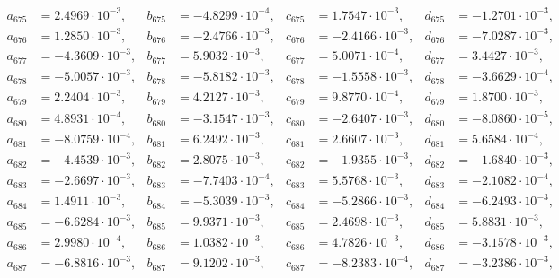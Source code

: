 \begin{align*}
  a_{ 675 } &= 2.4969 \cdot 10^{ -3 }, & b_{ 675 } &= -4.8299 \cdot 10^{ -4 }, & c_{ 675 } &= 1.7547 \cdot 10^{ -3 }, & d_{ 675 } &= -1.2701 \cdot 10^{ -3 }, \\ 
  a_{ 676 } &= 1.2850 \cdot 10^{ -3 }, & b_{ 676 } &= -2.4766 \cdot 10^{ -3 }, & c_{ 676 } &= -2.4166 \cdot 10^{ -3 }, & d_{ 676 } &= -7.0287 \cdot 10^{ -3 }, \\ 
  a_{ 677 } &= -4.3609 \cdot 10^{ -3 }, & b_{ 677 } &= 5.9032 \cdot 10^{ -3 }, & c_{ 677 } &= 5.0071 \cdot 10^{ -4 }, & d_{ 677 } &= 3.4427 \cdot 10^{ -3 }, \\ 
  a_{ 678 } &= -5.0057 \cdot 10^{ -3 }, & b_{ 678 } &= -5.8182 \cdot 10^{ -3 }, & c_{ 678 } &= -1.5558 \cdot 10^{ -3 }, & d_{ 678 } &= -3.6629 \cdot 10^{ -4 }, \\ 
  a_{ 679 } &= 2.2404 \cdot 10^{ -3 }, & b_{ 679 } &= 4.2127 \cdot 10^{ -3 }, & c_{ 679 } &= 9.8770 \cdot 10^{ -4 }, & d_{ 679 } &= 1.8700 \cdot 10^{ -3 }, \\ 
  a_{ 680 } &= 4.8931 \cdot 10^{ -4 }, & b_{ 680 } &= -3.1547 \cdot 10^{ -3 }, & c_{ 680 } &= -2.6407 \cdot 10^{ -3 }, & d_{ 680 } &= -8.0860 \cdot 10^{ -5 }, \\ 
  a_{ 681 } &= -8.0759 \cdot 10^{ -4 }, & b_{ 681 } &= 6.2492 \cdot 10^{ -3 }, & c_{ 681 } &= 2.6607 \cdot 10^{ -3 }, & d_{ 681 } &= 5.6584 \cdot 10^{ -4 }, \\ 
  a_{ 682 } &= -4.4539 \cdot 10^{ -3 }, & b_{ 682 } &= 2.8075 \cdot 10^{ -3 }, & c_{ 682 } &= -1.9355 \cdot 10^{ -3 }, & d_{ 682 } &= -1.6840 \cdot 10^{ -3 }, \\ 
  a_{ 683 } &= -2.6697 \cdot 10^{ -3 }, & b_{ 683 } &= -7.7403 \cdot 10^{ -4 }, & c_{ 683 } &= 5.5768 \cdot 10^{ -3 }, & d_{ 683 } &= -2.1082 \cdot 10^{ -4 }, \\ 
  a_{ 684 } &= 1.4911 \cdot 10^{ -3 }, & b_{ 684 } &= -5.3039 \cdot 10^{ -3 }, & c_{ 684 } &= -5.2866 \cdot 10^{ -3 }, & d_{ 684 } &= -6.2493 \cdot 10^{ -3 }, \\ 
  a_{ 685 } &= -6.6284 \cdot 10^{ -3 }, & b_{ 685 } &= 9.9371 \cdot 10^{ -3 }, & c_{ 685 } &= 2.4698 \cdot 10^{ -3 }, & d_{ 685 } &= 5.8831 \cdot 10^{ -3 }, \\ 
  a_{ 686 } &= 2.9980 \cdot 10^{ -4 }, & b_{ 686 } &= 1.0382 \cdot 10^{ -3 }, & c_{ 686 } &= 4.7826 \cdot 10^{ -3 }, & d_{ 686 } &= -3.1578 \cdot 10^{ -3 }, \\ 
  a_{ 687 } &= -6.8816 \cdot 10^{ -3 }, & b_{ 687 } &= 9.1202 \cdot 10^{ -3 }, & c_{ 687 } &= -8.2383 \cdot 10^{ -4 }, & d_{ 687 } &= -3.2386 \cdot 10^{ -3 }, \\ 

\end{align*}
